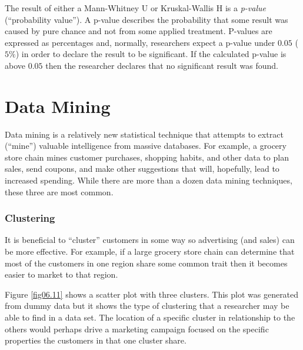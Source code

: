 The result of either a Mann-Whitney U or Kruskal-Wallis H is a \textit{p-value} (``probability value''). A p-value describes the probability that some result was caused by pure chance and not from some applied treatment. P-values are expressed as percentages and, normally, researchers expect a p-value under $ 0.05 $ ($ 5\% $) in order to declare the result to be significant. If the calculated p-value is above $ 0.05 $ then the researcher declares that no significant result was found.

\section{Data Mining}

Data mining is a relatively new statistical technique that attempts to extract (``mine'') valuable intelligence from massive databases. For example, a grocery store chain mines customer purchases, shopping habits, and other data to plan sales, send coupons, and make other suggestions that will, hopefully, lead to increased spending. While there are more than a dozen data mining techniques, these three are most common.

\subsubsection{Clustering}

It is beneficial to ``cluster'' customers in some way so advertising (and sales) can be more effective. For example, if a large grocery store chain can determine that most of the customers in one region share some common trait then it becomes easier to market to that region.

Figure \ref{fig06.11} shows a scatter plot with three clusters. This plot was generated from dummy data but it shows the type of clustering that a researcher may be able to find in a data set. The location of a specific cluster in relationship to the others would perhaps drive a marketing campaign focused on the specific properties the customers in that one cluster share.

